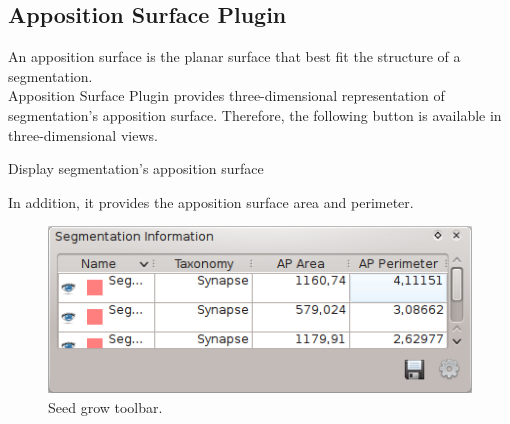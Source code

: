 \subsection{Apposition Surface Plugin}

An apposition surface is the planar surface that best fit the structure of a
segmentation.\\

Apposition Surface Plugin provides three-dimensional representation of
segmentation's apposition surface. Therefore, the following button is available
in three-dimensional views.\\

\vspace{0.3cm}

{Display segmentation's apposition surface}

In addition, it provides the apposition surface area and perimeter.\\

\begin{figure}[H]
\centering
\includegraphics{fig/AppSurface-info.png}
\caption{Seed grow toolbar.}
\end{figure}
